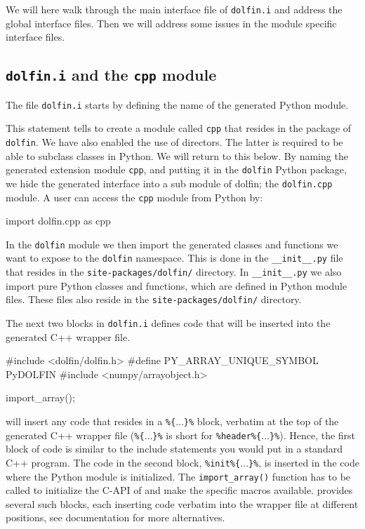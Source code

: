 We will here walk through the main interface file of \texttt{dolfin.i} and address the global interface files. Then we will address some issues in the module specific interface files.\par

\subsection{\texttt{dolfin.i} and the \texttt{cpp} module}
The file \texttt{dolfin.i} starts by defining the name of the generated Python module.
\begin{c++}
\end{c++}
This statement tells \swig to create a module called \texttt{cpp} that resides in the package of \texttt{dolfin}. We have also enabled the use of directors. The latter is required to be able to subclass \dolfin classes in Python. We will return to this below. By naming the generated extension module \texttt{cpp}, and putting it in the \texttt{dolfin} Python package, we hide the generated interface into a sub module of dolfin; the \texttt{dolfin.cpp} module. A user can access the \texttt{cpp} module from Python by:
\begin{python}
import dolfin.cpp as cpp
\end{python}
In the \texttt{dolfin} module we then import the generated classes and functions we want to expose to the \texttt{dolfin} namespace. This is done in the \texttt{\_\_init\_\_.py} file that resides in the \texttt{site-packages/dolfin/} directory. In \texttt{\_\_init\_\_.py} we also import pure Python classes and functions, which are defined in Python module files. These files also reside in the \texttt{site-packages/dolfin/} directory.\par

The next two blocks in \texttt{dolfin.i} defines code that will be inserted into the \swig generated C++ wrapper file.
\begin{c++}
#include <dolfin/dolfin.h>
#define PY_ARRAY_UNIQUE_SYMBOL PyDOLFIN
#include <numpy/arrayobject.h>

import_array();
\end{c++}
\swig will insert any code that resides in a \texttt{\%\{$\ldots$\}\%} block, verbatim at the top of the generated C++ wrapper file (\texttt{\%\{$\ldots$\}\%} is short for \texttt{\%header\%\{$\ldots$\}\%}). Hence, the first block of code is similar to the include statements you would put in a standard C++ program. The code in the second block, \texttt{\%init\%\{$\ldots$\}\%}, is inserted in the code where the Python module is initialized. The \texttt{import\_array()} function has to be called to initialize the C-API of \numpy and make the \numpy specific macros available. \swig provides several such blocks, each inserting code verbatim into the wrapper file at different positions, see \swig documentation for more alternatives\cite{www:swig}.\par

